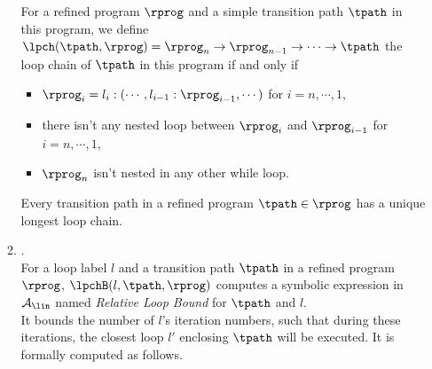 \begin{enumerate}
\begin{enumerate}
\begin{defn}
  \label{def:loopchain}
For a refined program $\rprog$ and a simple transition path $\tpath$ in this program, we define
$\lpch(\tpath, \rprog) = 
\rprog_n \to \rprog_{n-1} \to \cdots \to \tpath$
the loop chain of
$\tpath$ in this program if and only if 
%
\begin{itemize}
\item $\rprog_{i}= l_i : (\cdots, l_{i - 1} : \rprog_{i-1}, \cdots)$ for $i = n, \cdots, 1$,
\item there isn't any nested loop between $\rprog_{i}$ and $\rprog_{i - 1}$ for $i = n, \cdots, 1$,
 \item $\rprog_n$ isn't nested in any other while loop.
\end{itemize}
\end{defn}
%
Every transition path in a refined program $\tpath \in \rprog$ has a unique longest loop chain.
%
%
%
\item  {}.
\\
For a loop label $l$ and a transition path $\tpath$ in a refined program $\rprog$,
 $\lpchB(l, \tpath, \rprog)$ computes a symbolic expression in $\mathcal{A}_{\lin}$ named \emph{Relative Loop Bound}
 for $\tpath$ and $l$.
\\
It bounds the number of $l$'s iteration numbers,
such that during these iterations, the closest loop $l'$ enclosing $\tpath$ will be executed.
It is formally computed as follows.

\end{enumerate}
\end{enumerate}
